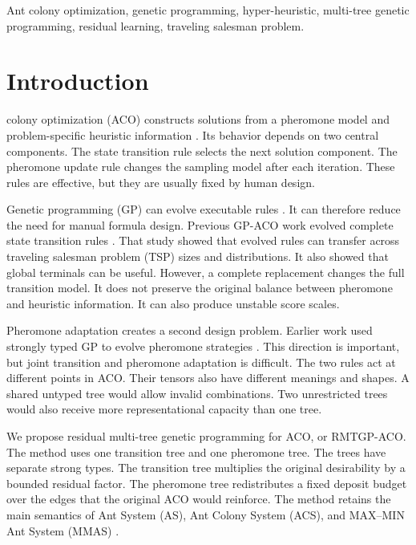 \documentclass[letterpaper,journal]{IEEEtran}
\begin{document}
\begin{IEEEkeywords}
Ant colony optimization, genetic programming, hyper-heuristic, multi-tree genetic programming, residual learning, traveling salesman problem.
\end{IEEEkeywords}

\section{Introduction}
 colony optimization (ACO) constructs solutions from a pheromone model and problem-specific heuristic information \cite{dorigo1996antsystem,dorigo2004aco}.
Its behavior depends on two central components.
The state transition rule selects the next solution component.
The pheromone update rule changes the sampling model after each iteration.
These rules are effective, but they are usually fixed by human design.

Genetic programming (GP) can evolve executable rules \cite{koza1992gp,poli2008fieldguide}.
It can therefore reduce the need for manual formula design.
Previous GP-ACO work evolved complete state transition rules \cite{lin2025gpaco}.
That study showed that evolved rules can transfer across traveling salesman problem (TSP) sizes and distributions.
It also showed that global terminals can be useful.
However, a complete replacement changes the full transition model.
It does not preserve the original balance between pheromone and heuristic information.
It can also produce unstable score scales.

Pheromone adaptation creates a second design problem.
Earlier work used strongly typed GP to evolve pheromone strategies \cite{tavares2011pheromone}.
This direction is important, but joint transition and pheromone adaptation is difficult.
The two rules act at different points in ACO.
Their tensors also have different meanings and shapes.
A shared untyped tree would allow invalid combinations.
Two unrestricted trees would also receive more representational capacity than one tree.

We propose residual multi-tree genetic programming for ACO, or RMTGP-ACO.
The method uses one transition tree and one pheromone tree.
The trees have separate strong types.
The transition tree multiplies the original desirability by a bounded residual factor.
The pheromone tree redistributes a fixed deposit budget over the edges that the original ACO would reinforce.
The method retains the main semantics of Ant System (AS), Ant Colony System (ACS), and MAX--MIN Ant System (MMAS) \cite{dorigo1996antsystem,dorigo1997acs,stutzle2000mmas}.
\end{document}
